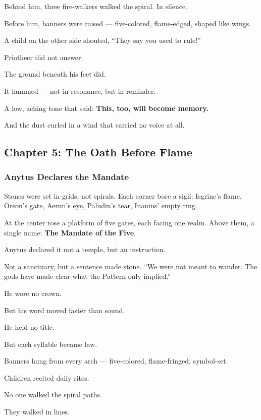 \documentclass[12pt]{article}
\begin{document}
Behind him, three fire-walkers walked the spiral.  
In silence.

Before him, banners were raised —  
five-colored, flame-edged, shaped like wings.

A child on the other side shouted,  
 “They say you used to rule!”

Priotheer did not answer.

The ground beneath his feet did.

It hummed —  
not in resonance,  
but in reminder.

A low, aching tone  
that said:  
 \textbf{This, too, will become memory.}

And the dust curled in a wind  
that carried no voice at all.

\newpage

\subsection{Chapter 5: The Oath Before Flame}

\vspace{.5in}

\subsubsection{Anytus Declares the Mandate}

Stones were set in grids, not spirals.  
Each corner bore a sigil:  
Isgrine’s flame, Orson’s gate, Aerun’s eye, Paludin’s tear, Inanius’ empty ring.

At the center rose a platform of five gates, each facing one realm.  
Above them, a single name: \textbf{The Mandate of the Five}.

Anytus declared it not a temple, but an instruction.  

Not a sanctuary, but a sentence made stone.  
 “We were not meant to wander.  
 The gods have made clear what the Pattern only implied.”

He wore no crown.  

But his word moved faster than sound.  

He held no title.  

But each syllable became law.

Banners hung from every arch — five-colored, flame-fringed, symbol-set.  

Children recited daily rites.  

No one walked the spiral paths.  

They walked in lines.
\end{document}

